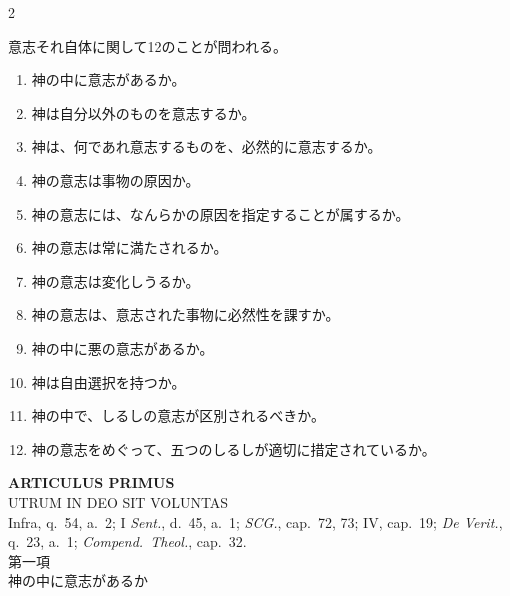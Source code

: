 \documentclass[paper=a4paper,fontsize=10pt,jafontsize=9pt,titlepage]{jlreq}
\begin{document}
\begin{paracol}{2}
\switchcolumn

意志それ自体に関して12のことが問われる。
 
\begin{enumerate}
 \item 神の中に意志があるか。
 \item 神は自分以外のものを意志するか。
 \item 神は、何であれ意志するものを、必然的に意志するか。
 \item 神の意志は事物の原因か。
 \item 神の意志には、なんらかの原因を指定することが属するか。
 \item 神の意志は常に満たされるか。
 \item 神の意志は変化しうるか。
 \item 神の意志は、意志された事物に必然性を課すか。
 \item 神の中に悪の意志があるか。
 \item 神は自由選択を持つか。
 \item 神の中で、しるしの意志が区別されるべきか。
 \item 神の意志をめぐって、五つのしるしが適切に措定されているか。
\end{enumerate}

\end{paracol}



\newpage

{}
\setcounter{section}{1}
\setcounter{subsection}{0}
\begin{center}
 {\Large {\bfseries ARTICULUS PRIMUS}}\\
 {\large UTRUM IN DEO SIT VOLUNTAS}\\
 {\footnotesize Infra, q.~54, a.~2; I {\itshape Sent.}, d.~45, a.~1;
 {\itshape SCG.}, cap.~72, 73; IV, cap.~19; {\itshape De Verit.}, q.~23,
 a.~1; {\itshape Compend.~Theol.}, cap.~32.}\\
 {\Large 第一項\\神の中に意志があるか}
\end{center}
\end{document}
